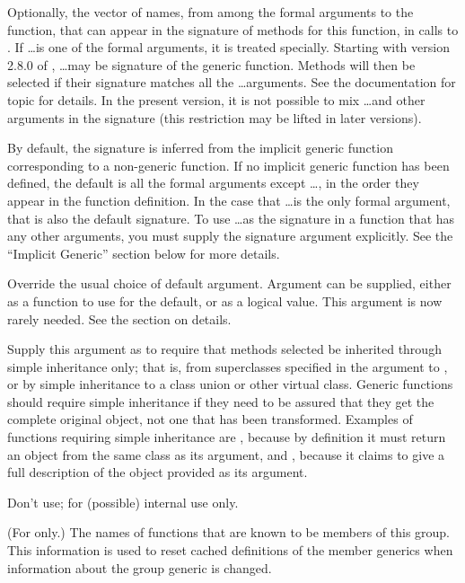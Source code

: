 \begin{Arguments}
\begin{ldescription}
\item[\code{signature}] 
Optionally, the vector of names, from among the formal arguments to
the function, that can appear in the signature of methods for this
function, in calls to .  If \dots is one of
the formal arguments, it is treated specially.  Starting with
version 2.8.0 of \R{}, \dots may be signature of the generic function.
Methods will then be selected if their signature matches all the
\dots arguments.  See the documentation for topic 
for details.  In the present version, it is not possible to mix
\dots and other arguments in the signature (this restriction may be
lifted in later versions).

By default, the signature is inferred from the implicit generic
function corresponding to a non-generic function.  If no implicit
generic function has been defined, the default is all the formal
arguments except \dots, in the order they appear in the function
definition. In the case that \dots is the only formal argument, that
is also the default signature.  To use \dots as the signature in a
function that has any other arguments, you must supply the signature
argument explicitly.  See the ``Implicit Generic'' section
below for more details.

\item[\code{useAsDefault}] 
Override the usual choice of default argument.
Argument  can be supplied, either as a function
to use for the default, or as a logical value.
This argument is now rarely needed.
See
the section on details.

\item[\code{simpleInheritanceOnly}] 
Supply this argument as  to require that methods selected
be inherited through simple inheritance only; that is, from
superclasses specified in the  argument to
, or by simple inheritance to a class union or
other virtual class.  Generic functions should require simple
inheritance if they need to be assured that they get the complete
original object, not one that has been transformed.  Examples of
functions requiring simple inheritance are ,
because by definition it must return an object from the same class
as its argument, and , because it claims to give a
full description of the object provided as its argument.

\item[\code{genericFunction}] Don't use; for (possible) internal use only.

\item[\code{knownMembers}] 
(For  only.)  The names of functions that are
known to be members of this group.  This information is used to
reset cached definitions of the member generics when information
about the group generic is changed.

\end{ldescription}
\end{Arguments}
